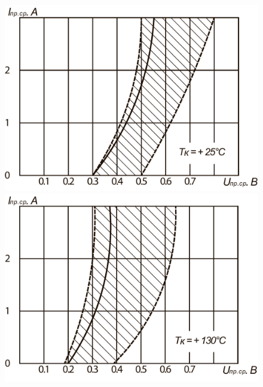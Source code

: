 \documentclass[a4paper,14pt]{extreport}
\begin{document}
\newpage
\begin{center}\end{center}
\begin{figure}[h!]\label{im12}
	\begin{minipage}[h]{0.524\linewidth}
		\includegraphics[width=1\linewidth]{1.15.pdf}
  \end{minipage}
\hfill
  \begin{minipage}[h]{0.524\linewidth}
		\includegraphics[width=1\linewidth]{1.16.pdf}
	\end{minipage}
\end{figure}
\end{document}
